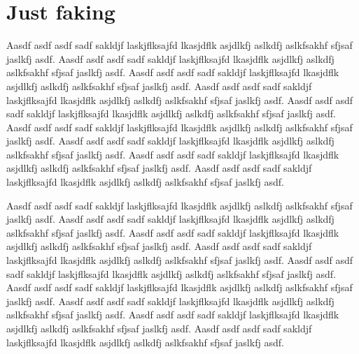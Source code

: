 \section{Just faking}
\label{sec:just-faking}

Aasdf asdf asdf sadf sakldjf laskjflksajfd lkasjdflk asjdlkfj aslkdfj
aslkfsakhf sfjsaf jaslkfj asdf.  Aasdf asdf asdf sadf sakldjf
laskjflksajfd lkasjdflk asjdlkfj aslkdfj aslkfsakhf sfjsaf jaslkfj
asdf.  Aasdf asdf asdf sadf sakldjf laskjflksajfd lkasjdflk asjdlkfj
aslkdfj aslkfsakhf sfjsaf jaslkfj asdf.  Aasdf asdf asdf sadf sakldjf
laskjflksajfd lkasjdflk asjdlkfj aslkdfj aslkfsakhf sfjsaf jaslkfj
asdf.  Aasdf asdf asdf sadf sakldjf laskjflksajfd lkasjdflk asjdlkfj
aslkdfj aslkfsakhf sfjsaf jaslkfj asdf.  Aasdf asdf asdf sadf sakldjf
laskjflksajfd lkasjdflk asjdlkfj aslkdfj aslkfsakhf sfjsaf jaslkfj
asdf.  Aasdf asdf asdf sadf sakldjf laskjflksajfd lkasjdflk asjdlkfj
aslkdfj aslkfsakhf sfjsaf jaslkfj asdf.  Aasdf asdf asdf sadf sakldjf
laskjflksajfd lkasjdflk asjdlkfj aslkdfj aslkfsakhf sfjsaf jaslkfj
asdf.  Aasdf asdf asdf sadf sakldjf laskjflksajfd lkasjdflk asjdlkfj
aslkdfj aslkfsakhf sfjsaf jaslkfj asdf.

Aasdf asdf asdf sadf sakldjf laskjflksajfd lkasjdflk asjdlkfj aslkdfj
aslkfsakhf sfjsaf jaslkfj asdf.  Aasdf asdf asdf sadf sakldjf
laskjflksajfd lkasjdflk asjdlkfj aslkdfj aslkfsakhf sfjsaf jaslkfj
asdf.  Aasdf asdf asdf sadf sakldjf laskjflksajfd lkasjdflk asjdlkfj
aslkdfj aslkfsakhf sfjsaf jaslkfj asdf.  Aasdf asdf asdf sadf sakldjf
laskjflksajfd lkasjdflk asjdlkfj aslkdfj aslkfsakhf sfjsaf jaslkfj
asdf.  Aasdf asdf asdf sadf sakldjf laskjflksajfd lkasjdflk asjdlkfj
aslkdfj aslkfsakhf sfjsaf jaslkfj asdf.  Aasdf asdf asdf sadf sakldjf
laskjflksajfd lkasjdflk asjdlkfj aslkdfj aslkfsakhf sfjsaf jaslkfj
asdf.  Aasdf asdf asdf sadf sakldjf laskjflksajfd lkasjdflk asjdlkfj
aslkdfj aslkfsakhf sfjsaf jaslkfj asdf.  Aasdf asdf asdf sadf sakldjf
laskjflksajfd lkasjdflk asjdlkfj aslkdfj aslkfsakhf sfjsaf jaslkfj
asdf.  Aasdf asdf asdf sadf sakldjf laskjflksajfd lkasjdflk asjdlkfj
aslkdfj aslkfsakhf sfjsaf jaslkfj asdf.


